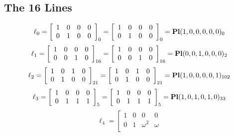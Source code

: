 \documentclass{article}
\begin{document}
{\subsection*{The 16 Lines}
$$
\ell_{0} = 
\left[
\begin{array}{*{4}{r}}
1 & 0 & 0 & 0\\
0 & 1 & 0 & 0\\
\end{array}
\right]
_{0}
=
\left[
\begin{array}{*{4}c}
1  & 0  & 0  & 0\\
0  & 1  & 0  & 0\\
\end{array}
\right]_{0}
={\rm\bf Pl}(1,0,0,0,0,0 )_{0}$$
$$
\ell_{1} = 
\left[
\begin{array}{*{4}{r}}
1 & 0 & 0 & 0\\
0 & 0 & 1 & 0\\
\end{array}
\right]
_{16}
=
\left[
\begin{array}{*{4}c}
1  & 0  & 0  & 0\\
0  & 0  & 1  & 0\\
\end{array}
\right]_{16}
={\rm\bf Pl}(0,0,1,0,0,0 )_{2}$$
$$
\ell_{2} = 
\left[
\begin{array}{*{4}{r}}
1 & 0 & 1 & 0\\
0 & 1 & 0 & 0\\
\end{array}
\right]
_{21}
=
\left[
\begin{array}{*{4}c}
1  & 0  & 1  & 0\\
0  & 1  & 0  & 0\\
\end{array}
\right]_{21}
={\rm\bf Pl}(1,0,0,0,0,1 )_{102}$$
$$
\ell_{3} = 
\left[
\begin{array}{*{4}{r}}
1 & 0 & 0 & 0\\
0 & 1 & 1 & 1\\
\end{array}
\right]
_{5}
=
\left[
\begin{array}{*{4}c}
1  & 0  & 0  & 0\\
0  & 1  & 1  & 1\\
\end{array}
\right]_{5}
={\rm\bf Pl}(1,0,1,0,1,0 )_{33}$$
$$
\ell_{4} = 
\left[
\begin{array}{*{4}{r}}
1 & 0 & 0 & 0\\
0 & 1 & \omega^{2} & \omega \\
\end{array}
$$}
\end{document}
